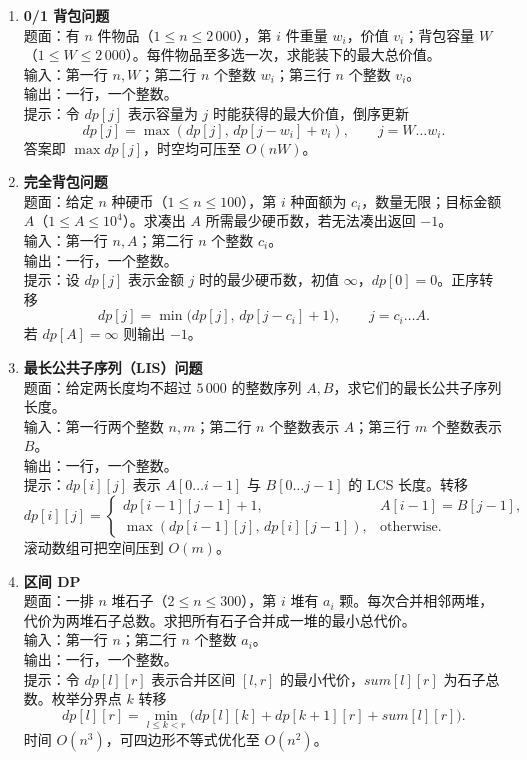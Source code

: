 \documentclass{article}
\begin{document}
\begin{enumerate}[label=\textbf{DP\arabic*.}]
  \item \textbf{0/1 背包问题}\\
    题面：有 $n$ 件物品（$1\le n\le 2\,000$），第 $i$ 件重量 $w_i$，价值 $v_i$；背包容量 $W$（$1\le W\le 2\,000$）。每件物品至多选一次，求能装下的最大总价值。\\
    输入：第一行 $n,W$；第二行 $n$ 个整数 $w_i$；第三行 $n$ 个整数 $v_i$。\\
    输出：一行，一个整数。\\
    提示：令 $dp[j]$ 表示容量为 $j$ 时能获得的最大价值，倒序更新
    $$dp[j]=\max (dp[j],\,dp[j-w_i]+v_i),\qquad j=W\ldots w_i.$$
    答案即 $\max dp[j]$，时空均可压至 $O(nW)$。

  \item \textbf{完全背包问题}\\
    题面：给定 $n$ 种硬币（$1\le n\le 100$），第 $i$ 种面额为 $c_i$，数量无限；目标金额 $A$（$1\le A\le 10^4$）。求凑出 $A$ 所需最少硬币数，若无法凑出返回 $-1$。\\
    输入：第一行 $n,A$；第二行 $n$ 个整数 $c_i$。\\
    输出：一行，一个整数。\\
    提示：设 $dp[j]$ 表示金额 $j$ 时的最少硬币数，初值 $\infty$，$dp[0]=0$。正序转移
    $$dp[j]=\min\!\bigl(dp[j],\,dp[j-c_i]+1\bigr),\qquad j=c_i\ldots A.$$
    若 $dp[A]=\infty$ 则输出 $-1$。

  \item \textbf{最长公共子序列（LIS）问题}\\
    题面：给定两长度均不超过 $5\,000$ 的整数序列 $A,B$，求它们的最长公共子序列长度。\\
    输入：第一行两个整数 $n,m$；第二行 $n$ 个整数表示 $A$；第三行 $m$ 个整数表示 $B$。\\
    输出：一行，一个整数。\\
    提示：$dp[i][j]$ 表示 $A[0\ldots i-1]$ 与 $B[0\ldots j-1]$ 的 LCS 长度。转移
    $$dp[i][j]=
    \begin{cases}
      dp[i-1][j-1]+1,&A[i-1]=B[j-1],\\[2pt]
      \max(dp[i-1][j],\,dp[i][j-1]),&\text{otherwise}.
    \end{cases}$$
    滚动数组可把空间压到 $O(m)$。

  \item \textbf{区间 DP}\\
    题面：一排 $n$ 堆石子（$2\le n\le 300$），第 $i$ 堆有 $a_i$ 颗。每次合并相邻两堆，代价为两堆石子总数。求把所有石子合并成一堆的最小总代价。\\
    输入：第一行 $n$；第二行 $n$ 个整数 $a_i$。\\
    输出：一行，一个整数。\\
    提示：令 $dp[l][r]$ 表示合并区间 $[l,r]$ 的最小代价，$sum[l][r]$ 为石子总数。枚举分界点 $k$ 转移
    $$dp[l][r]=\min_{l\le k<r}\!\bigl(dp[l][k]+dp[k+1][r]+sum[l][r]\bigr).$$
    时间 $O(n^3)$，可四边形不等式优化至 $O(n^2)$。


\end{enumerate}
\end{document}
